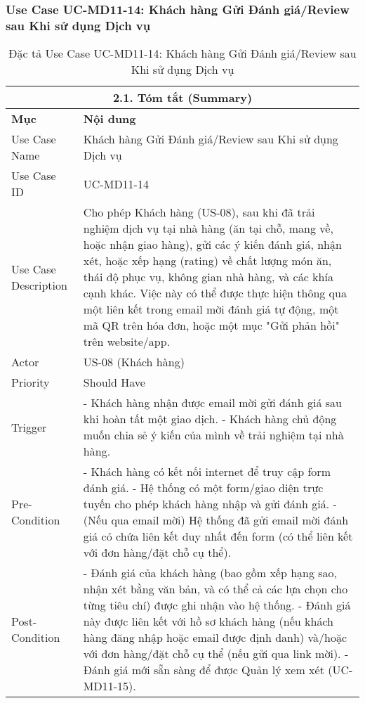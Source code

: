 \subsubsection{Use Case UC-MD11-14: Khách hàng Gửi Đánh giá/Review sau Khi sử dụng Dịch vụ}
\begin{longtable}{|m{4cm}|p{11cm}|}
\caption{Đặc tả Use Case UC-MD11-14: Khách hàng Gửi Đánh giá/Review sau Khi sử dụng Dịch vụ} \label{tab:uc_md11_14_customer_submit_review} \\
\hline
\multicolumn{2}{|c|}{\textbf{2.1. Tóm tắt (Summary)}} \\
\hline
\textbf{Mục} & \textbf{Nội dung} \\
\hline
\endhead
\midrule
\endfoot
\bottomrule
\endlastfoot
Use Case Name & Khách hàng Gửi Đánh giá/Review sau Khi sử dụng Dịch vụ \\
\hline
Use Case ID & UC-MD11-14 \\
\hline
Use Case Description & Cho phép Khách hàng (US-08), sau khi đã trải nghiệm dịch vụ tại nhà hàng (ăn tại chỗ, mang về, hoặc nhận giao hàng), gửi các ý kiến đánh giá, nhận xét, hoặc xếp hạng (rating) về chất lượng món ăn, thái độ phục vụ, không gian nhà hàng, và các khía cạnh khác. Việc này có thể được thực hiện thông qua một liên kết trong email mời đánh giá tự động, một mã QR trên hóa đơn, hoặc một mục "Gửi phản hồi" trên website/app. \\
\hline
Actor & US-08 (Khách hàng) \\
\hline
Priority & Should Have \\
\hline
Trigger & - Khách hàng nhận được email mời gửi đánh giá sau khi hoàn tất một giao dịch. \newline - Khách hàng chủ động muốn chia sẻ ý kiến của mình về trải nghiệm tại nhà hàng. \\
\hline
Pre-Condition & - Khách hàng có kết nối internet để truy cập form đánh giá. \newline - Hệ thống có một form/giao diện trực tuyến cho phép khách hàng nhập và gửi đánh giá. \newline - (Nếu qua email mời) Hệ thống đã gửi email mời đánh giá có chứa liên kết duy nhất đến form (có thể liên kết với đơn hàng/đặt chỗ cụ thể). \\
\hline
Post-Condition & - Đánh giá của khách hàng (bao gồm xếp hạng sao, nhận xét bằng văn bản, và có thể cả các lựa chọn cho từng tiêu chí) được ghi nhận vào hệ thống. \newline - Đánh giá này được liên kết với hồ sơ khách hàng (nếu khách hàng đăng nhập hoặc email được định danh) và/hoặc với đơn hàng/đặt chỗ cụ thể (nếu gửi qua link mời). \newline - Đánh giá mới sẵn sàng để được Quản lý xem xét (UC-MD11-15). \\

\end{longtable}
